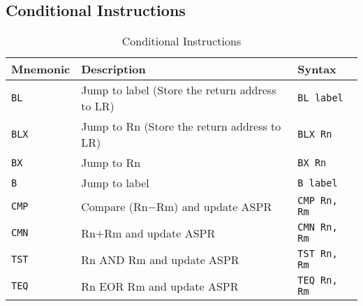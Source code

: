 \documentclass[a4paper,12pt,openany]{book}
\begin{document}
\subsection{Conditional Instructions}
\begin{table}[H]
    \centering
    \begin{tabular}{@{}lll@{}}
        \toprule
        Mnemonic & Description & Syntax \\
        \midrule
        \texttt{BL} & Jump to label (Store the return address to LR)& \texttt{BL label}\\
        \texttt{BLX} & Jump to Rn (Store the return address to LR)& \texttt{BLX Rn}\\
        \texttt{BX} & Jump to Rn & \texttt{BX Rn}\\
        \texttt{B} & Jump to label & \texttt{B label}\\
        \texttt{CMP} & Compare (Rn$-$Rm) and update ASPR & \texttt{CMP Rn, Rm}\\
        \texttt{CMN} & Rn$+$Rm and update ASPR & \texttt{CMN Rn, Rm}\\
        \texttt{TST} & Rn AND Rm and update ASPR & \texttt{TST Rn, Rm}\\
        \texttt{TEQ} & Rn EOR Rm and update ASPR & \texttt{TEQ Rn, Rm}\\
        \bottomrule
    \end{tabular}
    \label{tab:conditional_instructions}
    \caption{Conditional Instructions}
\end{table}
\end{document}
